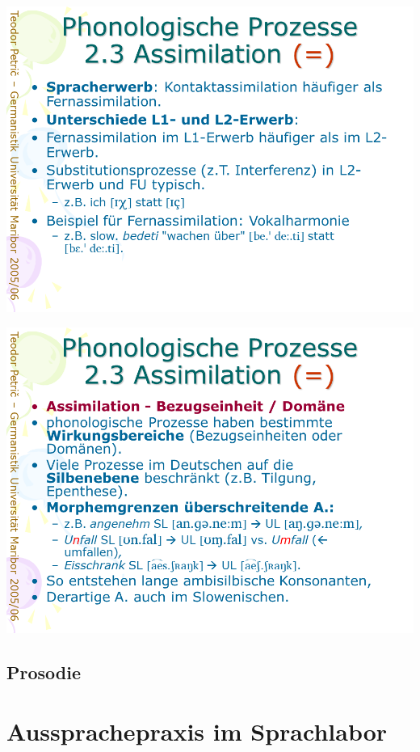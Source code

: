 \documentclass[
  letterpaper,
]{scrbook}
\begin{document}
\includegraphics[width=1\textwidth,height=\textheight]{./pictures/prozesse/prozesse_42.PNG}

\includegraphics[width=1\textwidth,height=\textheight]{./pictures/prozesse/prozesse_43.PNG}

\hypertarget{prosodie-1}{%
\chapter{Prosodie}\label{prosodie-1}}

\part{Aussprachepraxis im Sprachlabor}
\end{document}
